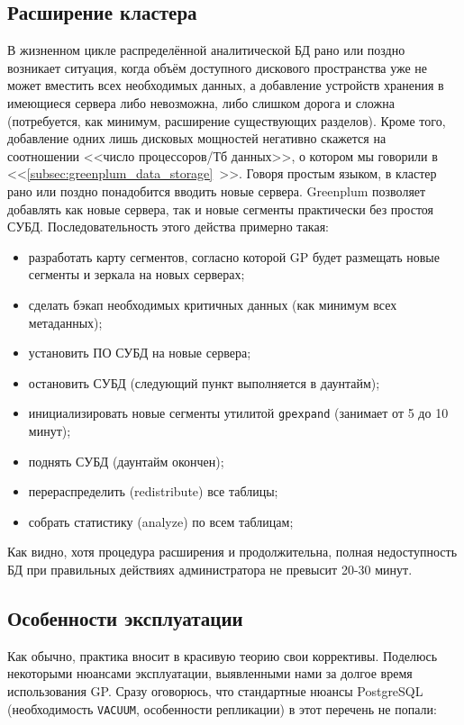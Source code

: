 \subsection{Расширение кластера}

В жизненном цикле распределённой аналитической БД рано или поздно возникает ситуация, когда объём доступного дискового пространства уже не может вместить всех необходимых данных, а добавление устройств хранения в имеющиеся сервера либо невозможна, либо слишком дорога и сложна (потребуется, как минимум, расширение существующих разделов). Кроме того, добавление одних лишь дисковых мощностей негативно скажется на соотношении <<число процессоров/Тб данных>>, о котором мы говорили в <<\ref{subsec:greenplum_data_storage}~>>. Говоря простым языком, в кластер рано или поздно понадобится вводить новые сервера. Greenplum позволяет добавлять как новые сервера, так и новые сегменты практически без простоя СУБД. Последовательность этого действа примерно такая:

\begin{itemize}
  \item разработать карту сегментов, согласно которой GP будет размещать новые сегменты и зеркала на новых серверах;
  \item сделать бэкап необходимых критичных данных (как минимум всех метаданных);
  \item установить ПО СУБД на новые сервера;
  \item остановить СУБД (следующий пункт выполняется в даунтайм);
  \item инициализировать новые сегменты утилитой \lstinline!gpexpand! (занимает от 5 до 10 минут);
  \item поднять СУБД (даунтайм окончен);
  \item перераспределить (redistribute) все таблицы;
  \item собрать статистику (analyze) по всем таблицам;
\end{itemize}

Как видно, хотя процедура расширения и продолжительна, полная недоступность БД при правильных действиях администратора не превысит 20-30 минут.


\subsection{Особенности эксплуатации}

Как обычно, практика вносит в красивую теорию свои коррективы. Поделюсь некоторыми нюансами эксплуатации, выявленными нами за долгое время использования GP. Сразу оговорюсь, что стандартные нюансы PostgreSQL (необходимость \lstinline!VACUUM!, особенности репликации) в этот перечень не попали:

